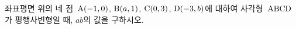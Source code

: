 좌표평면 위의 네 점~$\mathrm{A}(-1{,}\mkern3mu\mathopen{}0)$, $\mathrm{B}(a{,}\mkern3mu\mathopen{}1)$, $\mathrm{C}(0{,}\mkern3mu\mathopen{}3)$, $\mathrm{D}(-3{,}\mkern3mu\mathopen{}b)$에 대하여 사각형~$\mathrm{ABCD}$가 평행사변형일 때, $ab$의 값을 구하시오.
